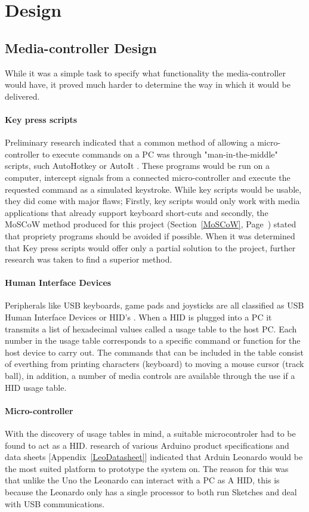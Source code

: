 \documentclass{article}
\begin{document}
	\section{Design}
		\subsection{Media-controller Design}
			While it was a simple task to specify what functionality the media-controller would have, it proved much harder to determine the way in which it would be delivered.
			
			\paragraph{Key press scripts}
			Preliminary research indicated that a common method of allowing a micro-controller to execute commands on a PC was through "man-in-the-middle" scripts, such AutoHotkey \cite{AutoHotkey:online} or AutoIt \cite{AutoIt:online}. These programs would be run on a computer, intercept signals from a connected micro-controller and execute the requested command as a simulated keystroke.
			While key scripts would be usable, they did come with major flaws; Firstly, key scripts would only work with media applications that already support keyboard short-cuts and secondly, the MoSCoW method produced for this project (Section~\ref{MoSCoW}, Page~\pageref{MoSCoW}) stated that propriety programs should be avoided if possible.
			When it was determined that Key press scripts would offer only a partial solution to the project, further research was taken to find a superior method.
			
			\paragraph{Human Interface Devices}
			Peripherals like USB keyboards, game pads and joysticks are all classified as USB Human Interface Devices or HID's \cite{HID:online} \cite{HIDSiliconLab:online}. When a HID is plugged into a PC it transmits a list of hexadecimal values called a usage table \cite{HIDUsagePage:online} to the host PC. Each number in the usage table corresponds to a specific command or function for the host device to carry out. The commands that can be included in the table consist of everthing from printing characters (keyboard) to moving a mouse cursor (track ball), in addition, a number of media controls are available through the use if a HID usage table. 
			
			\paragraph{Micro-controller}
			With the discovery of usage tables in mind, a suitable microcontroler had to be found to act as a HID. research of various Arduino product specifications \cite{Uno:online} \cite{Leonardo:online} \cite{LeonardoGuide:online} and data sheets [Appendix~\ref{LeoDatasheet}] indicated that Arduin Leonardo would be the most suited platform to prototype the system on. The reason for this was that unlike the Uno the Leonardo can interact with a PC as A HID, this is because the Leonardo only has a single processor to both run Sketches and deal with USB communications.
			
\end{document}
